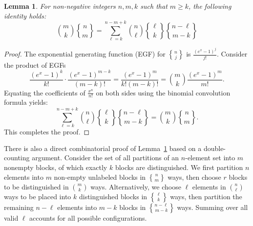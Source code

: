 \documentclass[12pt]{amsart}
\newtheorem{lemma}[theorem]{Lemma}
\theoremstyle{definition}
\begin{document}
\begin{lemma}\label{Con1}
For non-negative integers $n, m, k$ such that $m \geq k$, the following identity holds:
\begin{equation*}
    \binom{m}{k} {n \brace m} = \sum_{\ell=k}^{n-m+k} \binom{n}{\ell} {\ell \brace k} {n-\ell \brace m-k}
\end{equation*}
\end{lemma}
\begin{proof}
The exponential generating function (EGF) for ${n \brace j}$ is $\frac{(e^x - 1)^j}{j!}$. Consider the product of EGFs
\begin{equation*}
    \frac{(e^x - 1)^k}{k!} \cdot \frac{(e^x - 1)^{m-k}}{(m-k)!} = \frac{(e^x - 1)^m}{k! (m-k)!} = \binom{m}{k} \frac{(e^x - 1)^m}{m!}.
\end{equation*}
Equating the coefficients of $\frac{x^n}{n!}$ on both sides using the binomial convolution formula yields:
\begin{equation*}
    \sum_{\ell=k}^{n-m+k} \binom{n}{\ell} {\ell \brace k} {n-\ell \brace m-k} = \binom{m}{k} {n \brace m}.
\end{equation*}
This completes the proof.
\end{proof}
There is also a direct combinatorial proof of Lemma~\ref{Con1} based on a double-counting argument. Consider the set of all partitions of an $n$-element set into $m$ nonempty blocks, of which exactly $k$ blocks are distinguished.
We first partition $n$ elements into $m$ non-empty unlabeled blocks in ${n \brace m}$ ways, then choose $r$ blocks to be distinguished in $\binom{m}{k}$ ways.
Alternatively, we choose $\ell$ elements in $\binom{n}{\ell}$ ways to be placed into $k$ distinguished blocks in ${\ell \brace k}$ ways, then partition the remaining $n-\ell$ elements into $m-k$ blocks in ${n-\ell \brace m-k}$ ways. Summing over all valid $\ell$ accounts for all possible configurations.
\end{document}

